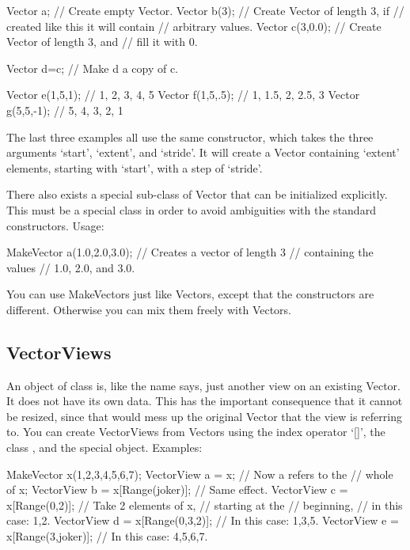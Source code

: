 \begin{code}
Vector a;         // Create empty Vector.
Vector b(3);      // Create Vector of length 3, if
                  // created like this it will contain
                  // arbitrary values.
Vector c(3,0.0);  // Create Vector of length 3, and
                  // fill it with 0.

Vector d=c;       // Make d a copy of c.

Vector e(1,5,1);  // 1, 2, 3, 4, 5
Vector f(1,5,.5); // 1, 1.5, 2, 2.5, 3
Vector g(5,5,-1); // 5, 4, 3, 2, 1
\end{code}

The last three examples all use the same constructor, which takes
the three arguments `start', `extent', and `stride'. It will create a
Vector containing `extent' elements, starting with `start', with a
step of `stride'.

There also exists a special sub-class of Vector that can be initialized
explicitly. This must be a special class in order to avoid ambiguities
with the standard constructors. Usage:

\begin{code}
MakeVector a(1.0,2.0,3.0);  // Creates a vector of length 3 
                            // containing the values 
                            // 1.0, 2.0, and 3.0.
\end{code}

You can use MakeVectors just like Vectors, except that the
constructors are different. Otherwise you can mix them freely with
Vectors. 

\subsection{VectorViews}
\label{sec:vector_views}

An object of class  is, like the name says, just
another view on an existing Vector. It does not have its own
data. This has the important consequence that it cannot be resized,
since that would mess up the original Vector that the view is
referring to. You can create VectorViews from Vectors using the index
operator `[]', the class , and the special 
object. Examples:

\begin{code}
MakeVector x(1,2,3,4,5,6,7); 
VectorView a = x;                 // Now a refers to the 
                                  // whole of x;
VectorView b = x[Range(joker)];   // Same effect.
VectorView c = x[Range(0,2)];     // Take 2 elements of x, 
                                  // starting at the 
                                  // beginning,
                                  // in this case: 1,2.
VectorView d = x[Range(0,3,2)];   // In this case: 1,3,5.
VectorView e = x[Range(3,joker)]; // In this case: 4,5,6,7.
\end{code}


